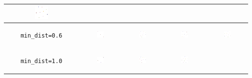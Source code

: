\begin{tabular}{c|c|c|c|c}
	 \includegraphics*[width = 0.19\textwidth]{min=0,3,n=7.png} \\
	 \hline
	 \begin{sideways} \verb|min_dist=0.6| \end{sideways} & \includegraphics*[width = 0.19\textwidth]{min=0,6,n=2.png} & \includegraphics*[width = 0.19\textwidth]{min=0,6,n=3.png} & \includegraphics*[width = 0.19\textwidth]{min=0,6,n=5.png} & 
	 \includegraphics*[width = 0.19\textwidth]{min=0,6,n=7.png} \\
	 \hline
	 \begin{sideways} \verb|min_dist=1.0| \end{sideways} & \includegraphics*[width = 0.19\textwidth]{min=1,0,n=2.png} & \includegraphics*[width = 0.19\textwidth]{min=1,0,n=3.png} & \includegraphics*[width = 0.19\textwidth]{min=1,0,n=5.png} & 

\end{tabular}
